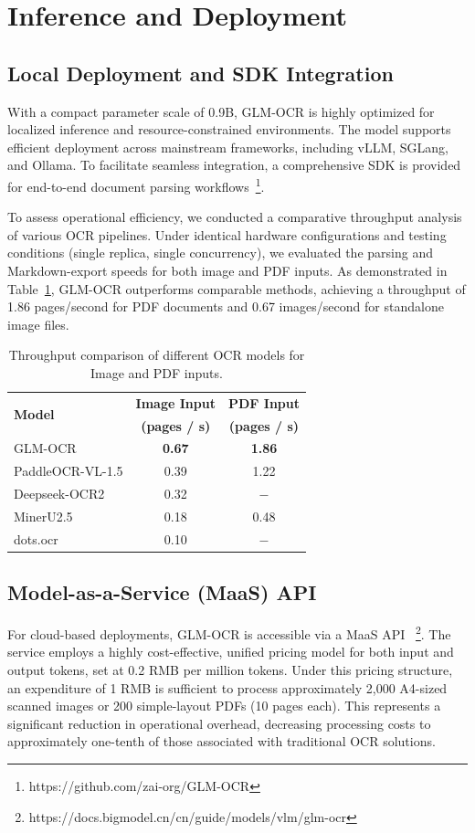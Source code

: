\section{Inference and Deployment}
\label{sec:inference_deployment}

\subsection{Local Deployment and SDK Integration}
With a compact parameter scale of 0.9B, GLM-OCR is highly optimized for localized inference and resource-constrained environments. The model supports efficient deployment across mainstream frameworks, including vLLM, SGLang, and Ollama. To facilitate seamless integration, a comprehensive SDK is provided for end-to-end document parsing workflows~\footnote{https://github.com/zai-org/GLM-OCR}.

To assess operational efficiency, we conducted a comparative throughput analysis of various OCR pipelines. Under identical hardware configurations and testing conditions (single replica, single concurrency), we evaluated the parsing and Markdown-export speeds for both image and PDF inputs. As demonstrated in Table~\ref{tab:ocr_throughput}, GLM-OCR outperforms comparable methods, achieving a throughput of 1.86 pages/second for PDF documents and 0.67 images/second for standalone image files.

\begin{table}[htbp]
    \centering
    \caption{Throughput comparison of different OCR models for Image and PDF inputs.}
    \label{tab:ocr_throughput}
    \begin{tabular}{lcc}
        \toprule
        \multirow{2}{*}{\textbf{Model}} & \textbf{Image Input} & \textbf{PDF Input} \\
        & \textbf{(pages / s)} & \textbf{(pages / s)} \\
        \midrule
        GLM-OCR & \textbf{0.67} & \textbf{1.86} \\
        PaddleOCR-VL-1.5 & 0.39 & 1.22 \\
        Deepseek-OCR2 & 0.32 & $-$ \\
        MinerU2.5 & 0.18 & 0.48 \\
        dots.ocr & 0.10 & $-$ \\
        \bottomrule
    \end{tabular}
\end{table}

\subsection{Model-as-a-Service (MaaS) API}
For cloud-based deployments, GLM-OCR is accessible via a MaaS API
~\footnote{https://docs.bigmodel.cn/cn/guide/models/vlm/glm-ocr}. The service employs a highly cost-effective, unified pricing model for both input and output tokens, set at 0.2 RMB per million tokens. Under this pricing structure, an expenditure of 1 RMB is sufficient to process approximately 2,000 A4-sized scanned images or 200 simple-layout PDFs (10 pages each). This represents a significant reduction in operational overhead, decreasing processing costs to approximately one-tenth of those associated with traditional OCR solutions.

